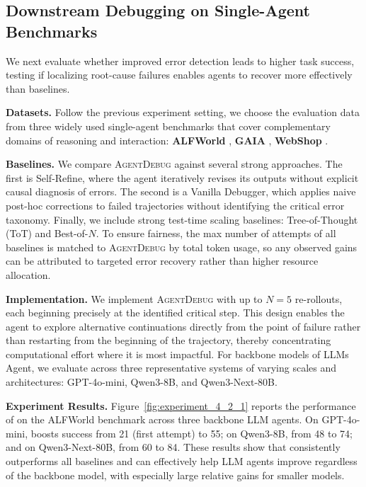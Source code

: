 \subsection{Downstream Debugging on Single-Agent Benchmarks}
\label{subsec:downstream}

We next evaluate whether improved error detection leads to higher task success, testing if localizing root-cause failures enables agents to recover more effectively than baselines.

\noindent\textbf{Datasets.}  
Follow the previous experiment setting, we choose the evaluation data from three widely used single-agent benchmarks that cover complementary domains of reasoning and interaction: \textbf{ALFWorld} \citep{shridhar2020alfworld}, \textbf{GAIA} \citep{mialon2023gaia}, \textbf{WebShop} \citep{yao2022webshop}.

\noindent\textbf{Baselines.}  
We compare \textsc{AgentDebug} against several strong approaches. The first is Self-Refine, where the agent iteratively revises its outputs without explicit causal diagnosis of errors. The second is a Vanilla Debugger, which applies naive post-hoc corrections to failed trajectories without identifying the critical error taxonomy. Finally, we include strong test-time scaling baselines: Tree-of-Thought (ToT) and Best-of-$N$.  To ensure fairness, the max number of attempts of all baselines is matched to \textsc{AgentDebug} by total token usage, so any observed gains can be attributed to targeted error recovery rather than higher resource allocation.  

\noindent\textbf{Implementation.}  
We implement \textsc{AgentDebug} with up to $N=5$ re-rollouts, each beginning precisely at the identified critical step. This design enables the agent to explore alternative continuations directly from the point of failure rather than restarting from the beginning of the trajectory, thereby concentrating computational effort where it is most impactful. For backbone models of LLMs Agent, we evaluate across three representative systems of varying scales and architectures: GPT-4o-mini, Qwen3-8B, and Qwen3-Next-80B. 

\noindent\textbf{Experiment Results.} Figure~\ref{fig:experiment_4_2_1} reports the performance of \ModelName{} on the ALFWorld benchmark across three backbone LLM agents. On GPT-4o-mini, \ModelName{} boosts success from 21 (first attempt) to 55; on Qwen3-8B, from 48 to 74; and on Qwen3-Next-80B, from 60 to 84. These results show that \ModelName{} consistently outperforms all baselines and can effectively help LLM agents improve regardless of the backbone model, with especially large relative gains for smaller models. 


